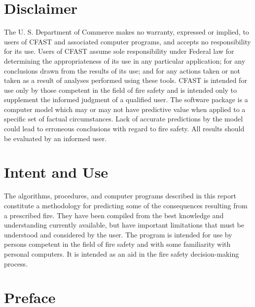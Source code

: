 \documentclass[12pt]{book}
\begin{document}
\newpage

\frontmatter

\pagestyle{plain}
\setcounter{page}{3}

\chapter{Disclaimer}

The U. S. Department of Commerce makes no warranty, expressed or implied, to users of 
CFAST and associated computer programs, and accepts no responsibility for its use.  Users of 
CFAST assume sole responsibility under Federal law for determining the appropriateness of its 
use in any particular application; for any conclusions drawn from the results of its use; and for 
any actions taken or not taken as a result of analyses performed using these tools. 
CFAST is intended for use only by those competent in the field of fire safety and is intended 
only to supplement the informed judgment of a qualified user. The software package is a 
computer model which may or may not have predictive value when applied to a specific set of 
factual circumstances. Lack of accurate predictions by the model could lead to erroneous 
conclusions with regard to fire safety. All results should be evaluated by an informed user.

\chapter{Intent and Use}

The algorithms, procedures, and computer programs described in this report constitute a 
methodology for predicting some of the consequences resulting from a prescribed fire.  They 
have been compiled from the best knowledge and understanding currently available, but have 
important limitations that must be understood and considered by the user.  The program is 
intended for use by persons competent in the field of fire safety and with some familiarity with 
personal computers. It is intended as an aid in the fire safety decision-making process.

\chapter{Preface}
\end{document}
